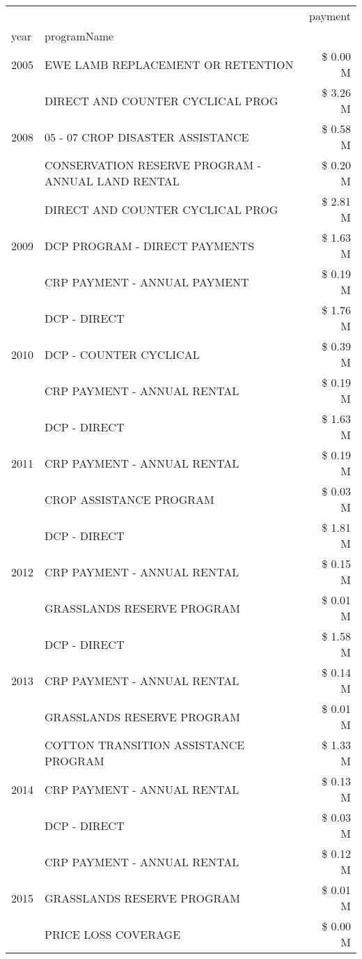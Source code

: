 \begin{tabular}{llr}
\toprule
 &  & payment \\
year & programName &  \\
\midrule
2005 & EWE LAMB REPLACEMENT OR RETENTION & \$ 0.00 M \\
\cline{1-3}
\multirow[t]{3}{*}{2008} & DIRECT AND COUNTER CYCLICAL PROG & \$ 3.26 M \\
 & 05 - 07 CROP DISASTER ASSISTANCE & \$ 0.58 M \\
 & CONSERVATION RESERVE PROGRAM - ANNUAL LAND RENTAL & \$ 0.20 M \\
\cline{1-3}
\multirow[t]{3}{*}{2009} & DIRECT AND COUNTER CYCLICAL PROG & \$ 2.81 M \\
 & DCP PROGRAM - DIRECT PAYMENTS & \$ 1.63 M \\
 & CRP PAYMENT - ANNUAL PAYMENT & \$ 0.19 M \\
\cline{1-3}
\multirow[t]{3}{*}{2010} & DCP - DIRECT & \$ 1.76 M \\
 & DCP - COUNTER CYCLICAL & \$ 0.39 M \\
 & CRP PAYMENT - ANNUAL RENTAL & \$ 0.19 M \\
\cline{1-3}
\multirow[t]{3}{*}{2011} & DCP - DIRECT & \$ 1.63 M \\
 & CRP PAYMENT - ANNUAL RENTAL & \$ 0.19 M \\
 & CROP ASSISTANCE PROGRAM & \$ 0.03 M \\
\cline{1-3}
\multirow[t]{3}{*}{2012} & DCP - DIRECT & \$ 1.81 M \\
 & CRP PAYMENT - ANNUAL RENTAL & \$ 0.15 M \\
 & GRASSLANDS RESERVE PROGRAM & \$ 0.01 M \\
\cline{1-3}
\multirow[t]{3}{*}{2013} & DCP - DIRECT & \$ 1.58 M \\
 & CRP PAYMENT - ANNUAL RENTAL & \$ 0.14 M \\
 & GRASSLANDS RESERVE PROGRAM & \$ 0.01 M \\
\cline{1-3}
\multirow[t]{3}{*}{2014} & COTTON TRANSITION ASSISTANCE PROGRAM & \$ 1.33 M \\
 & CRP PAYMENT - ANNUAL RENTAL & \$ 0.13 M \\
 & DCP - DIRECT & \$ 0.03 M \\
\cline{1-3}
\multirow[t]{3}{*}{2015} & CRP PAYMENT - ANNUAL RENTAL & \$ 0.12 M \\
 & GRASSLANDS RESERVE PROGRAM & \$ 0.01 M \\
 & PRICE LOSS COVERAGE & \$ 0.00 M \\

\end{tabular}
